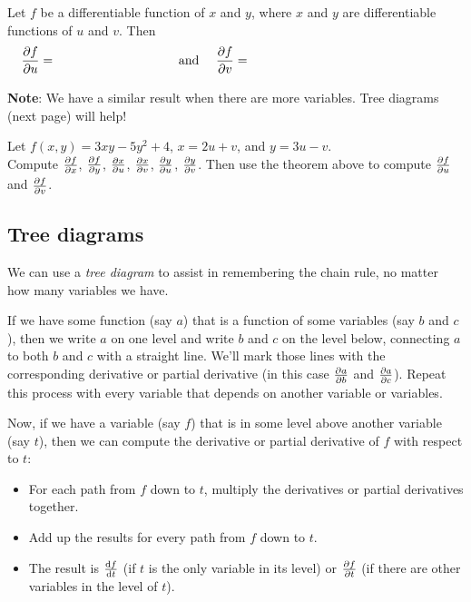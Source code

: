 \begin{thm}
Let $f$ be a differentiable function of $x$ and $y$, where $x$ and $y$ are differentiable functions of $u$ and $v$. Then 
\[\hspace{-1in}\pfp{f}{u}=\phantom{\pfp{f}{x}\cdot\pfp{x}{u}+\pfp{f}{y}\cdot\pfp{y}{u}} \quad \text{ and } \quad \pfp{f}{v}=\phantom{\pfp{f}{x}\cdot\pfp{x}{v} + \pfp{f}{y}\cdot\pfp{y}{v}.}\]
\end{thm}
\noindent \textbf{Note}: We have a similar result when there are more variables. Tree diagrams (next page) will help!
\begin{ex}
Let $f(x,y)=3xy-5y^2+4$, \quad $x=2u+v$, \quad and $y=3u-v$.\\

Compute $\frac{\partial f}{\partial x}$, $\frac{\partial f}{\partial y}$, $\frac{\partial x}{\partial u}$, $\frac{\partial x}{\partial v}$, $\frac{\partial y}{\partial u}$, $\frac{\partial y}{\partial v}$.  Then use the theorem above to compute $\frac{\partial f}{\partial u}$ and $\frac{\partial f}{\partial v}$.
\end{ex}
\vfill
\pagebreak
\fi 

\subsection{Tree diagrams}
We can use a \emph{tree diagram} to assist in remembering the chain rule, no matter how many variables we have.

If we have some function (say $a$) that is a function of some variables (say $b$ and $c$), then we write $a$ on one level and write $b$ and $c$ on the level below, connecting $a$ to both $b$ and $c$ with a straight line. We'll mark those lines with the corresponding derivative or partial derivative (in this case $\frac{\partial a}{\partial b}$ and $\frac{\partial a}{\partial c}$). Repeat this process with every variable that depends on another variable or variables.

Now, if we have a variable (say $f$) that is in some level above another variable (say $t$), then we can compute the derivative or partial derivative of $f$ with respect to $t$:
\begin{itemize}
    \item For each path from $f$ down to $t$, multiply the derivatives or partial derivatives together. 
    \item Add up the results for every path from $f$ down to $t$.
    \item The result is $\frac{\mathop{}\!\mathrm{d} f}{\mathop{}\!\mathrm{d} t}$ (if $t$ is the only variable in its level) or $\frac{\partial f}{\partial t}$ (if there are other variables in the level of $t$).
\end{itemize}

